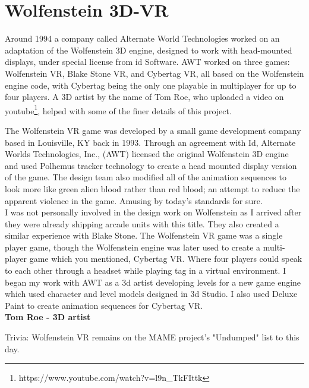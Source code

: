 \section{Wolfenstein 3D-VR}
Around 1994 a company called Alternate World Technologies worked on an adaptation of the Wolfenstein 3D engine, designed to work with head-mounted displays, under special license from id Software. AWT worked on three games: Wolfenstein VR, Blake Stone VR, and Cybertag VR, all based on the Wolfenstein engine code, with Cybertag being the only one playable in multiplayer for up to four players. A 3D artist by the name of Tom Roe, who uploaded a video on youtube\footnote{https://www.youtube.com/watch?v=l9n\_TkFIttk}, helped with some of the finer details of this project.\\

\begin{fancyquotes}
The Wolfenstein VR game was developed by a small game development company based in Louisville, KY back in 1993. Through an agreement with Id, Alternate Worlds Technologies, Inc., (AWT) licensed the original Wolfenstein 3D engine and used Polhemus tracker technology to create a head mounted display version of the game. The design team also modified all of the animation sequences to look more like green alien blood rather than red blood; an attempt to reduce the apparent violence in the game. Amusing by today's standards for sure.
 \bigskip \\
I was not personally involved in the design work on Wolfenstein as I arrived after they were already shipping arcade units with this title. They also created a similar experience with Blake Stone. The Wolfenstein VR game was a single player game, though the Wolfenstein engine was later used to create a multi-player game which you mentioned, Cybertag VR. Where four players could speak to each other through a headset while playing tag in a virtual environment. I began my work with AWT as a 3d artist developing levels for a new game engine which used character and level models designed in 3d Studio. I also used Deluxe Paint to create animation sequences for Cybertag VR.
 \bigskip \\
\textbf{Tom Roe - 3D artist}
 \end{fancyquotes}


Trivia: Wolfenstein VR remains on the MAME project's "Undumped" list to this day.

